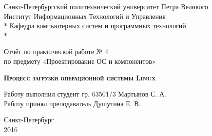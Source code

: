 \begin{titlepage}
\thispagestyle{empty}

\begin{center}
Санкт-Петербургский политехнический университет Петра Великого\\
Институт Информационных Технологий и Управления \\*
Кафедра компьютерных систем и программных технологий \\*
\hrulefill
\end{center}

\vspace{15em}

\begin{center}
\Large Отчёт по практической работе № 4\\по предмету «Проектирование ОС и компонентов» \\
\end{center}

\vspace{1em}

\begin{center}
\textsc{\textbf{\textsc{\textbf{Процесс загрузки операционной системы Linux}}}}
\end{center}

\vspace{20em}

\begin{flushleft}
Работу выполнил студент гр. 63501/3 \hrulefill Мартынов С. А. \\
\vspace{1.5em}
Работу принял преподаватель \hrulefill Душутина Е. В. \\
\end{flushleft}

\vspace{\fill}

\begin{center}
Санкт-Петербург \\
2016
\end{center}

\end{titlepage}
\setcounter{page}{2}